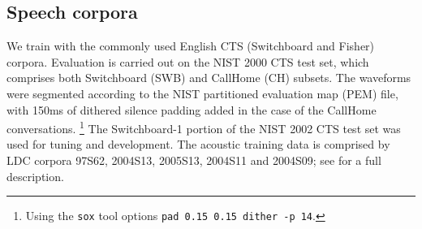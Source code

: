 \documentclass{article}
\begin{document}
\subsection{Speech corpora}
We train with the commonly used English CTS (Switchboard and Fisher) corpora.
Evaluation is carried out on the NIST 2000 CTS test set, which comprises both Switchboard (SWB) and CallHome (CH)
subsets.
The waveforms were segmented according to the NIST partitioned evaluation map (PEM) file,
with 150ms of dithered silence padding added in the case of the CallHome conversations.%
\footnote{Using the {\tt sox} tool options {\tt pad 0.15 0.15 dither -p 14}.}
The Switchboard-1 portion of the NIST 2002 CTS test set was used for tuning and development.
The acoustic training data is comprised by LDC corpora 97S62, 2004S13, 2005S13,
2004S11 and 2004S09; see \cite{chen2006advances} for a full description.
\end{document}
